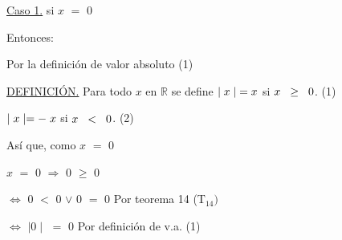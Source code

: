 \documentclass[12pt]{article}
\begin{document}
{\textcolor{palatinateblue}{{\underline{Caso 1.}} }} si {\Large{$x$ $=$ $0$}}\vspace{0.5cm}

{\textcolor{palatinateblue}{Entonces:}} \vspace{0.5cm}

{\textcolor{carrotorange}{Por la definición de valor absoluto (1)}} \vspace{0.5cm}

\begin{center}
    
{\underline{DEFINICIÓN.}} Para todo $x$ en $\mathbb{R}$ se define $\mid x\mid \hspace{0.1cm} = x$ \hspace{0.45cm} si \hspace{0.2cm} $x\hspace{0.2cm} \geq \hspace{0.2cm}0$. (1) \vspace{0.1cm}

\hspace{8.63cm} $\mid x\mid = -\hspace{0.1cm}  x$ \hspace{0.2cm} si \hspace{0.1cm} $x\hspace{0.2cm} < \hspace{0.2cm}0$. (2) 
\vspace{0.3cm}

\end{center} \vspace{0.5cm}

{\textcolor{palatinateblue}{Así que, como } $x$ $=$ $0$} \vspace{0.5cm}

\hspace{4cm} $x$ $=$ $0$ $\Longrightarrow$ $0$ $\geq$ $0$ \vspace{0.5cm}

\hspace{5.3cm} $\Longleftrightarrow$ $0$ $<$ $0$ $\vee$ $0$ $=$ $0$ \hspace{0.1cm} {\textcolor{carrotorange}{Por teorema 14 (T$_{14})$}}\vspace{0.5cm} 

\hspace{5.35cm} $\Longleftrightarrow$ $\mid 0 \mid$ $=$ $0$ \hspace{1.43cm} {\textcolor{carrotorange}{Por definición de v.a. (1)}}\vspace{0.5cm} 
\end{document}
